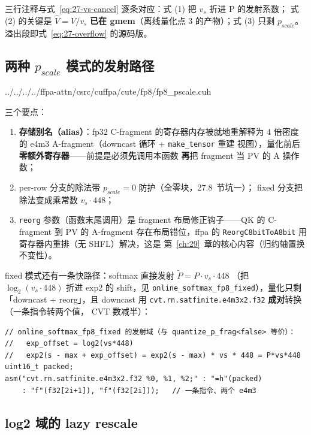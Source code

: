 三行注释与式~\ref{eq:27-vs-cancel} 逐条对应：式 (1) 把 $v_s$ 折进 P 的发射系数；
式 (2) 的关键是 $\hat V = V/v_s$ \textbf{已在 gmem}（离线量化点 3 的产物）；式
(3) 只剩 $p_{scale}$。溢出段即式~\ref{eq:27-overflow} 的源码版。

\subsection{两种 $p_{scale}$ 模式的发射路径}


  {../../../../ffpa-attn/csrc/cuffpa/cute/fp8/fp8_pscale.cuh}

三个要点：
\begin{enumerate}[itemsep=2pt,topsep=2pt]
  \item \textbf{存储别名（alias）}：fp32 C-fragment 的寄存器内存被就地重解释为
        4 倍密度的 e4m3 A-fragment（downcast 循环 + \texttt{make\_tensor} 重建
        视图），量化前后\textbf{零额外寄存器}——前提是必须\textbf{先}调用本函数
        \textbf{再}把 fragment 当 PV 的 A 操作数；
  \item per-row 分支的除法带 $p_{scale} = 0$ 防护（全零块，27.8~节坑一）；
        fixed 分支把除法变成乘常数 $v_s \cdot 448$；
  \item \texttt{reorg} 参数（函数末尾调用）是 fragment 布局修正钩子——QK 的
        C-fragment 到 PV 的 A-fragment 存在布局错位，ffpa 的
        \texttt{ReorgC8bitToA8bit} 用寄存器内重排（无 SHFL）解决，这是
        第~\ref{ch:29}~章的核心内容（归约轴置换不变性）。
\end{enumerate}

fixed 模式还有一条快路径：softmax 直接发射 $\tilde{P} = P \cdot v_s \cdot 448$
（把 $\log_2(v_s \cdot 448)$ 折进 exp2 的 shift，见
\texttt{online\_softmax\_fp8\_fixed}），量化只剩「downcast + reorg」，且 downcast
用 \texttt{cvt.rn.satfinite.e4m3x2.f32} \textbf{成对}转换（一条指令转两个值，
CVT 数减半）：
\begin{lstlisting}[style=pseudo]
// online_softmax_fp8_fixed 的发射域（与 quantize_p_frag<false> 等价）：
//   exp_offset = log2(vs*448)
//   exp2(s - max + exp_offset) = exp2(s - max) * vs * 448 = P*vs*448
uint16_t packed;
asm("cvt.rn.satfinite.e4m3x2.f32 %0, %1, %2;" : "=h"(packed)
    : "f"(f32[2i+1]), "f"(f32[2i]));   // 一条指令、两个 e4m3
\end{lstlisting}

\subsection{log2 域的 lazy rescale}

